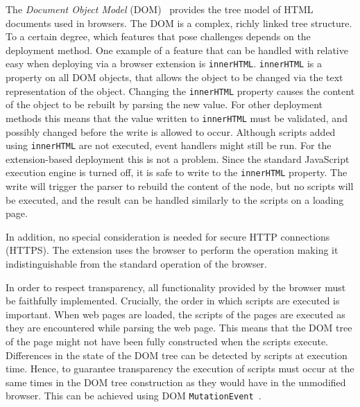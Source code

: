 \documentclass{llncs}
\begin{document}
The \emph{Document Object Model} (DOM)~\cite{DOM2} provides the tree model of HTML
documents used in browsers. The DOM is a complex, richly linked tree structure.
To a certain degree, which features that pose challenges depends on the deployment method. One example of a feature that can be handled with 
relative easy when deploying via a browser extension is 
\lstinline{innerHTML}. \lstinline{innerHTML} is a property on all DOM objects,
that allows the object to be changed via the text representation of the object. 
Changing the \lstinline{innerHTML} property 
causes the content of the object to be rebuilt by parsing the new value. For other deployment methods this means that the value written to
\lstinline{innerHTML} must be validated, and possibly changed before the write
is allowed to occur. Although scripts added using \lstinline{innerHTML}
are not executed, event handlers might still be run.
%
For the extension-based deployment this is not a problem.  Since the standard
JavaScript execution engine is turned off, it is safe to write to the
\lstinline{innerHTML} property. The write will trigger the parser to rebuild
the content of the node, but no scripts will be executed, and the result can be
handled similarly to the scripts on a loading page.

In addition, no special consideration is needed for secure HTTP connections
(HTTPS). The extension uses the browser to perform the operation making
it indistinguishable from the standard operation of the browser.

In order to respect transparency, all
functionality provided by the browser must be faithfully implemented.
%
Crucially, the order in which scripts are executed is important.  When web pages
are loaded, the scripts of the pages are executed as they are encountered while
parsing the web page. This means that the DOM tree of the page might not have
been fully constructed when the scripts execute. Differences in the state of
the DOM tree can be detected by scripts at execution time. Hence, to guarantee
transparency the execution of scripts must occur at the same times in the DOM
tree construction as they would have in the unmodified browser.
This can be achieved using DOM \lstinline{MutationEvent}~\cite{DOM3Event}.
\end{document}

